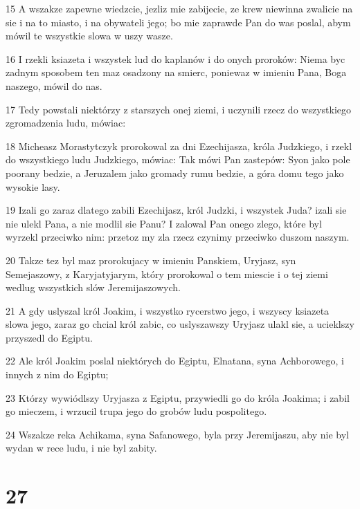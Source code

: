 \par 15 A wszakze zapewne wiedzcie, jezliz mie zabijecie, ze krew niewinna zwalicie na sie i na to miasto, i na obywateli jego; bo mie zaprawde Pan do was poslal, abym mówil te wszystkie slowa w uszy wasze.
\par 16 I rzekli ksiazeta i wszystek lud do kaplanów i do onych proroków: Niema byc zadnym sposobem ten maz osadzony na smierc, poniewaz w imieniu Pana, Boga naszego, mówil do nas.
\par 17 Tedy powstali niektórzy z starszych onej ziemi, i uczynili rzecz do wszystkiego zgromadzenia ludu, mówiac:
\par 18 Micheasz Morastytczyk prorokowal za dni Ezechijasza, króla Judzkiego, i rzekl do wszystkiego ludu Judzkiego, mówiac: Tak mówi Pan zastepów: Syon jako pole poorany bedzie, a Jeruzalem jako gromady rumu bedzie, a góra domu tego jako wysokie lasy.
\par 19 Izali go zaraz dlatego zabili Ezechijasz, król Judzki, i wszystek Juda? izali sie nie ulekl Pana, a nie modlil sie Panu? I zalowal Pan onego zlego, które byl wyrzekl przeciwko nim: przetoz my zla rzecz czynimy przeciwko duszom naszym.
\par 20 Takze tez byl maz prorokujacy w imieniu Panskiem, Uryjasz, syn Semejaszowy, z Karyjatyjarym, który prorokowal o tem miescie i o tej ziemi wedlug wszystkich slów Jeremijaszowych.
\par 21 A gdy uslyszal król Joakim, i wszystko rycerstwo jego, i wszyscy ksiazeta slowa jego, zaraz go chcial król zabic, co uslyszawszy Uryjasz ulakl sie, a ucieklszy przyszedl do Egiptu.
\par 22 Ale król Joakim poslal niektórych do Egiptu, Elnatana, syna Achborowego, i innych z nim do Egiptu;
\par 23 Którzy wywiódlszy Uryjasza z Egiptu, przywiedli go do króla Joakima; i zabil go mieczem, i wrzucil trupa jego do grobów ludu pospolitego.
\par 24 Wszakze reka Achikama, syna Safanowego, byla przy Jeremijaszu, aby nie byl wydan w rece ludu, i nie byl zabity.

\chapter{27}

